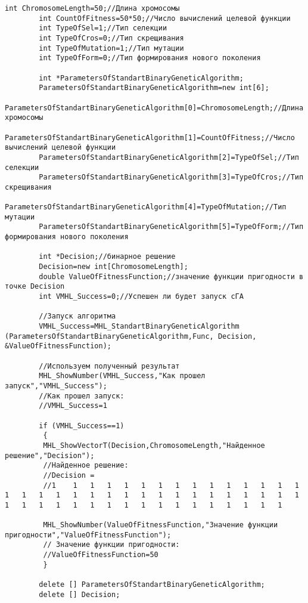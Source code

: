 \documentclass[a4paper,12pt]{article}
\begin{document}
\begin{lstlisting}[label=code_use_MHL_StandartBinaryGeneticAlgorithm,caption=Пример использования]
        int ChromosomeLength=50;//Длина хромосомы
        int CountOfFitness=50*50;//Число вычислений целевой функции
        int TypeOfSel=1;//Тип селекции
        int TypeOfCros=0;//Тип скрещивания
        int TypeOfMutation=1;//Тип мутации
        int TypeOfForm=0;//Тип формирования нового поколения

        int *ParametersOfStandartBinaryGeneticAlgorithm;
        ParametersOfStandartBinaryGeneticAlgorithm=new int[6];
        ParametersOfStandartBinaryGeneticAlgorithm[0]=ChromosomeLength;//Длина хромосомы
        ParametersOfStandartBinaryGeneticAlgorithm[1]=CountOfFitness;//Число вычислений целевой функции
        ParametersOfStandartBinaryGeneticAlgorithm[2]=TypeOfSel;//Тип селекции
        ParametersOfStandartBinaryGeneticAlgorithm[3]=TypeOfCros;//Тип скрещивания
        ParametersOfStandartBinaryGeneticAlgorithm[4]=TypeOfMutation;//Тип мутации
        ParametersOfStandartBinaryGeneticAlgorithm[5]=TypeOfForm;//Тип формирования нового поколения

        int *Decision;//бинарное решение
        Decision=new int[ChromosomeLength];
        double ValueOfFitnessFunction;//значение функции пригодности в точке Decision
        int VMHL_Success=0;//Успешен ли будет запуск cГА

        //Запуск алгоритма
        VMHL_Success=MHL_StandartBinaryGeneticAlgorithm (ParametersOfStandartBinaryGeneticAlgorithm,Func, Decision, &ValueOfFitnessFunction);

        //Используем полученный результат
        MHL_ShowNumber(VMHL_Success,"Как прошел запуск","VMHL_Success");
        //Как прошел запуск:
        //VMHL_Success=1

        if (VMHL_Success==1)
         {
         MHL_ShowVectorT(Decision,ChromosomeLength,"Найденное решение","Decision");
         //Найденное решение:
         //Decision =
         //1	1	1	1	1	1	1	1	1	1	1	1	1	1	1	1	1	1	1	1	1	1	1	1	1	1	1	1	1	1	1	1	1	1	1	1	1	1	1	1	1	1	1	1	1	1	1	1	1	1

         MHL_ShowNumber(ValueOfFitnessFunction,"Значение функции пригодности","ValueOfFitnessFunction");
         // Значение функции пригодности:
         //ValueOfFitnessFunction=50
         }

        delete [] ParametersOfStandartBinaryGeneticAlgorithm;
        delete [] Decision;
\end{lstlisting}
\end{document}
